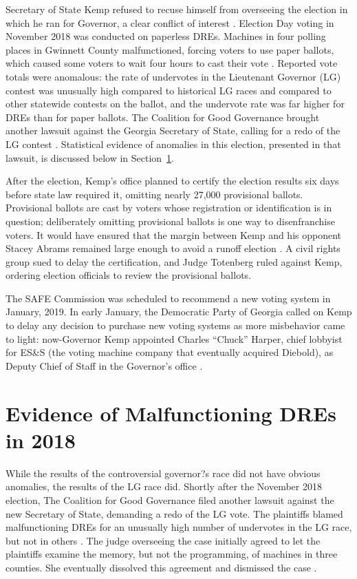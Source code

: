 \documentclass[runningheads]{llncs}
\begin{document}
Secretary of State Kemp refused to recuse himself from overseeing the election in which he ran for Governor, 
a clear conflict of interest \cite{williams_georgia_2018}.
Election Day voting in November 2018 was conducted on paperless DREs.
Machines in four polling places in Gwinnett County malfunctioned, forcing
voters to use paper ballots, which caused some voters to wait four hours to cast their vote \cite{lockhart_voting_2018}.
Reported vote totals were anomalous: 
the rate of undervotes in the Lieutenant Governor (LG) contest was unusually high
compared to historical LG races and compared to other
statewide contests on the ballot, and the undervote rate was far higher for DREs than for
paper ballots.
The Coalition for Good Governance brought another lawsuit against the Georgia
Secretary of State, calling for a redo of the LG contest \cite{coalition_crittenden_2019}.
Statistical evidence of anomalies in this election, presented in that lawsuit, is discussed 
below in Section~\ref{sec:ga_stats}.

After the election, Kemp's office planned to certify the election results six days before state law required it,
omitting nearly 27,000 provisional ballots.
Provisional ballots are cast by voters whose registration or identification is in question;
deliberately omitting provisional ballots is one way to disenfranchise voters.
It would have ensured that the margin between Kemp and his opponent Stacey Abrams remained 
large enough to avoid a runoff election \cite{blinder_federal_2018}.
A civil rights group sued to delay the certification, and
Judge Totenberg ruled against Kemp,
ordering election officials to review the provisional ballots.

The SAFE Commission was scheduled to recommend a new voting system in January, 2019.
In early January, the Democratic Party of Georgia called on Kemp to delay any decision to purchase
new voting systems as more misbehavior came to light:
now-Governor Kemp appointed Charles ``Chuck'' Harper, chief lobbyist for ES\&S (the voting machine
company that eventually acquired Diebold), as Deputy Chief of Staff in the Governor's office \cite{noauthor_SAFE_2019}.

 
\section{Evidence of Malfunctioning DREs in 2018}\label{sec:ga_stats}

While the results of the controversial governor?s race did not have obvious anomalies, the results of the LG race did.
Shortly after the November 2018 election, The Coalition for Good Governance  filed another lawsuit 
against the new Secretary of State, demanding a redo of the LG vote.
The plaintiffs blamed malfunctioning DREs for an unusually high number of undervotes in the LG race, but not in others \cite{coalition_crittenden_2019}.
The judge overseeing the case initially agreed to let the plaintiffs examine the memory, but not the programming, of machines in three counties.
She eventually dissolved this agreement and dismissed the case \cite{zetter_georgia_2019}.
\end{document}
